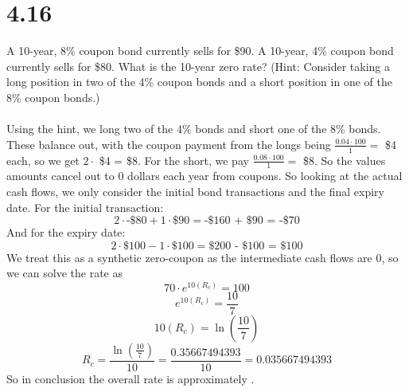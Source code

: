 \documentclass{article}
\begin{document}
{\Large 

\section*{4.16}

A 10-year, 8\% coupon bond currently sells for \$90. A 10-year, 4\% coupon bond currently sells for \$80. What is the 10-year zero rate? (Hint: Consider taking a long position in two of
the 4\% coupon bonds and a short position in one of the 8\% coupon bonds.) \\ \\
Using the hint, we long two of the 4\% bonds and short one of the 8\% bonds. These balance out, with the coupon payment from the longs being \(\frac{0.04 \cdot 100}{1} = \) \$4 each, so we get \(2 \cdot \) \$4 = \$8. For the short, we pay \(\frac{0.08 \cdot 100}{1} = \) \$8. So the values amounts cancel out to 0 dollars each year from coupons. So looking at the actual cash flows, we only consider the initial bond transactions and the final expiry date. For the initial transaction: 
\[
  2 \cdot \text{-\$80} + 1 \cdot \text{\$90} = \text{-\$160 + \$90 = -\$70}
\]
And for the expiry date:
\[
  2 \cdot \text{\$100} - 1 \cdot \text{\$100} = \text{\$200 - \$100 = \$100}
\]
We treat this as a synthetic zero-coupon as the intermediate cash flows are 0, so we can solve the rate as 
\[
  70 \cdot e^{10(R_c)} = 100
\]
\[
  e^{10(R_c)} = \frac{10}{7}
\] 
\[
  10(R_c) = \ln(\frac{10}{7})
\]
\[
  R_c = \frac{\ln(\frac{10}{7})}{10} = \frac{0.35667494393}{10} = 0.035667494393
\]
So in conclusion the overall rate is approximately .

}
\end{document}
